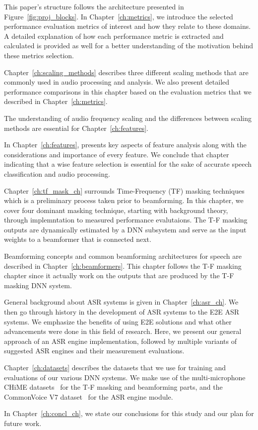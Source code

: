 This paper's structure follows the architecture
presented in Figure~\ref{fig:proj_blocks}.
In Chapter~\ref{ch:metrics}, 
we introduce the selected performance evaluation metrics
of interest and how they relate to these domains. 
A detailed explanation of how each performance metric is
extracted and calculated is provided as well
for a better understanding of the motivation behind
these metrics selection.

Chapter~\ref{ch:scaling_methods} describes three different scaling methods
that are commonly used in audio processing and analysis.
We also present detailed performance comparisons in this chapter based on
the evaluation metrics that we described in Chapter~\ref{ch:metrics}.

The understanding of audio frequency scaling and 
the differences between scaling methods
are essential for Chapter~\ref{ch:features}.

In Chapter~\ref{ch:features}, 
presents key aspects of feature analysis 
along with the considerations 
and importance of every feature.
We conclude that chapter indicating 
that a wise feature selection 
is essential for the sake of 
accurate speech classification and audio processing. 

Chapter~\ref{ch:tf_mask_ch} surrounds Time-Frequency (TF) 
masking techniques which is a preliminary process taken prior
to beamforming. 
In this chapter, we cover four
dominant masking technique, starting with background theory,
through implemntation to measured performance evalutaions.
The T-F masking outputs are dynamically estimated
by a DNN subsystem 
and serve as the input weights
to a beamformer that is connected next.

Beamforming concepts and 
common beamforming architectures for speech
are described in Chapter~\ref{ch:beamformers}.
This chapter follows the T-F masking chapter
since it actually work on the outputs that are produced
by the T-F masking DNN system.

General background about 
ASR systems is given in
Chapter~\ref{ch:asr_ch}.
We then go through history in the development
of ASR systems to the E2E ASR systems.
We emphasize the benefits of using E2E solutions
and what other advancements were done in this field of research.
Here, we present our general approach of an ASR engine implementation,
followed by multiple variants of 
suggested ASR engines and their measurement evaluations.

Chapter~\ref{ch:datasets} describes the datasets that
we use for training and evaluations of our various
DNN systems. We make use of the multi-microphone CHiME datasets~\cite{chime3DS}
for the T-F masking and beamforming parts, 
and the CommonVoice V7 dataset~\cite{commonVoiceDS}
for the ASR engine module.

In Chapter~\ref{ch:concl_ch}, we state our conclusions for this study
and our plan for future work.